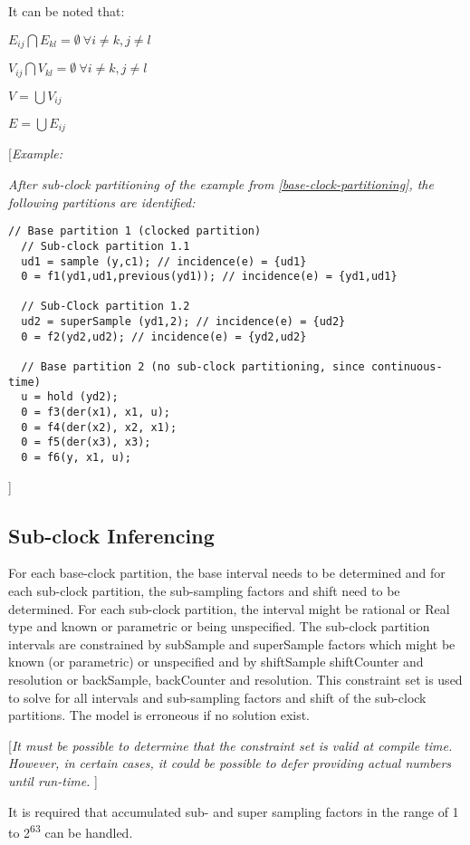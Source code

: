 It can be noted that:

$E_{ij} \bigcap E_{kl} = \emptyset~ \forall i\ne{}k, j\ne{}l$

$ V_{ij} \bigcap V_{kl} = \emptyset~ \forall i\ne{}k, j\ne{}l$

$V = \bigcup V_{ij}$

$E = \bigcup E_{ij}$

{[}\emph{Example:}

\emph{After sub-clock partitioning of the example from \autoref{base-clock-partitioning}, the following partitions are identified:}
\begin{lstlisting}[language=modelica]
  // Base partition 1 (clocked partition)
  // Sub-clock partition 1.1
  ud1 = sample (y,c1); // incidence(e) = {ud1}
  0 = f1(yd1,ud1,previous(yd1)); // incidence(e) = {yd1,ud1}

  // Sub-Clock partition 1.2
  ud2 = superSample (yd1,2); // incidence(e) = {ud2}
  0 = f2(yd2,ud2); // incidence(e) = {yd2,ud2}

  // Base partition 2 (no sub-clock partitioning, since continuous-time)
  u = hold (yd2);
  0 = f3(der(x1), x1, u);
  0 = f4(der(x2), x2, x1);
  0 = f5(der(x3), x3);
  0 = f6(y, x1, u);
\end{lstlisting}
{]}

\subsection{Sub-clock Inferencing}

For each base-clock partition, the base interval needs to be determined
and for each sub-clock partition, the sub-sampling factors and shift
need to be determined. For each sub-clock partition, the interval might
be rational or Real type and known or parametric or being unspecified.
The sub-clock partition intervals are constrained by subSample and
superSample factors which might be known (or parametric) or unspecified
and by shiftSample shiftCounter and resolution or backSample,
backCounter and resolution. This constraint set is used to solve for all
intervals and sub-sampling factors and shift of the sub-clock
partitions. The model is erroneous if no solution exist.

{[}\emph{It must be possible to determine that the constraint set is
valid at compile time. However, in certain cases, it could be possible
to defer providing actual numbers until run-time.} {]}

It is required that accumulated sub- and super sampling factors in the
range of 1 to 2\textsuperscript{63} can be handled.

